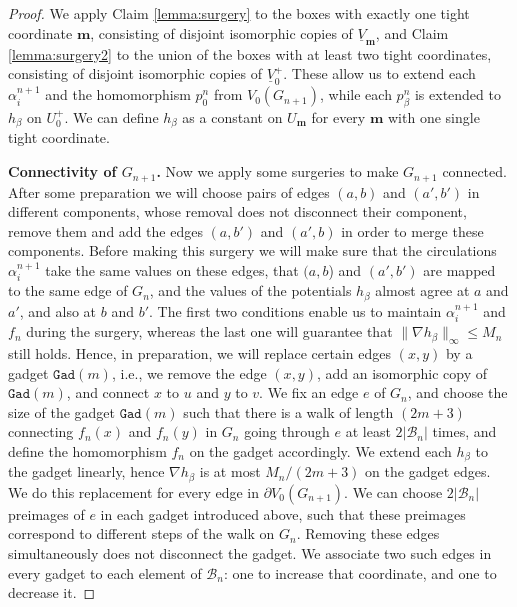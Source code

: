 \documentclass[10pt,a4paper]{amsart}
\begin{document}
\begin{proof}
We apply Claim \ref{lemma:surgery} to the boxes with exactly one tight coordinate $\mathbf{m}$, consisting of disjoint isomorphic copies of $\underline{V}_{\mathbf{m}}$, and Claim \ref{lemma:surgery2} to the union of the boxes with at least two tight coordinates, consisting of disjoint isomorphic copies of $\underline{V}_0^+$. These allow us to extend each $\alpha_i^{n+1}$ and the homomorphism $p_0^n$ from $V_0(G_{n+1})$, while each $p^n_{\beta}$ is extended to $h_\beta$ on $U_0^+$. We can define $h_\beta$ as a constant on $U_{\mathbf{m}}$ for every $\mathbf{m}$ with one single tight coordinate. 

{\bf Connectivity of $G_{n+1}$.} Now we apply some surgeries to make $G_{n+1}$ connected. After some preparation we will choose pairs of edges $(a,b)$ and $(a',b')$ in different components, whose removal does not disconnect their component, remove them and add the edges $(a,b')$ and $(a',b)$ in order to merge these components. Before making this surgery we will make sure that the circulations $\alpha_i^{n+1}$ take the same values on these edges, that $(a,b$) and $(a',b')$ are mapped to the same edge of $G_n$, and the values of the potentials $h_{\beta}$ almost agree at $a$ and $a'$, and also at $b$ and $b'$. The first two conditions enable us to maintain $\alpha_i^{n+1}$ and $f_n$ during the surgery, whereas the last one will guarantee that $\|\nabla h_{\beta}\|_{\infty} \leq M_n$ still holds. Hence, in preparation, we will replace certain edges $(x,y)$ by a gadget $\texttt{Gad}(m)$, i.e., we remove the edge $(x,y)$, add an isomorphic copy of $\texttt{Gad}(m)$, and connect $x$ to $u$ and $y$ to $v$. We fix an edge $e$ of $G_n$, and choose the size of the gadget $\texttt{Gad}(m)$ such that there is a walk of length $(2m+3)$ connecting $f_n(x)$ and $f_n(y)$ in $G_n$ going through $e$ at least $2|\mathcal{B}_n|$ times, and define the homomorphism $f_n$ on the gadget accordingly. We extend each $h_{\beta}$ to the gadget linearly, hence $\nabla h_{\beta}$ is at most $M_n/(2m+3)$ on the gadget edges. We do this replacement for every edge in $\partial V_0(G_{n+1})$. We can choose $2|\mathcal{B}_n|$ preimages of $e$ in each gadget introduced above, such that these preimages correspond to different steps of the walk on $G_n$. Removing these edges simultaneously does not disconnect the gadget. We associate two such edges in every gadget to each element of $\mathcal{B}_n$: one to increase that coordinate, and one to decrease it.   


\end{proof}
\end{document}
